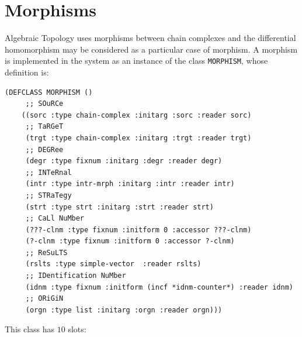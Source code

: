 \newpage

\section {Morphisms}

Algebraic  Topology uses  morphisms between chain complexes and 
the dif\-fe\-ren\-ti\-al homomorphism may be considered as a particular
case of  morphism. A morphism is implemented in the system as an instance
of the class {\tt MORPHISM}, whose definition is:
{\footnotesize\begin{verbatim}
(DEFCLASS MORPHISM ()
     ;; SOuRCe
    ((sorc :type chain-complex :initarg :sorc :reader sorc)
     ;; TaRGeT
     (trgt :type chain-complex :initarg :trgt :reader trgt)
     ;; DEGRee
     (degr :type fixnum :initarg :degr :reader degr)
     ;; INTeRnal
     (intr :type intr-mrph :initarg :intr :reader intr)
     ;; STRaTegy
     (strt :type strt :initarg :strt :reader strt)
     ;; CaLl NuMber
     (???-clnm :type fixnum :initform 0 :accessor ???-clnm)
     (?-clnm :type fixnum :initform 0 :accessor ?-clnm)
     ;; ReSuLTS
     (rslts :type simple-vector  :reader rslts)
     ;; IDentification NuMber
     (idnm :type fixnum :initform (incf *idnm-counter*) :reader idnm)
     ;; ORiGiN
     (orgn :type list :initarg :orgn :reader orgn)))
\end{verbatim}}
This class has $10$ slots:
